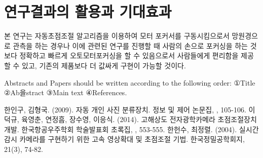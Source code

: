 \documentclass{abstract_hutech}
\begin{document}
\section{연구결과의 활용과 기대효과}

본 연구는 자동초점조절 알고리즘을 이용하여 모터 포커서를 구동시킴으로서 망원경으로 관측을 하는 경우나 이에 관련된 연구를 진행할 때 사람의 손으로 포커싱을 하는 것보다 정확하고 빠르게 오토모터포커싱을 할 수 있음으로서 사람들에게 편리함을 제공할 수 있고, 기존의 제품보다 더 값싸게 구현이 가능할 것이다.

Abstracts and Papers should be written according to the following order: ①Title ②Ab을stract ③Main text ④References.

\begin{thebibliography}{99}
 한인구, 김형국. (2009). 자동 개인 사진 분류장치. 정보 및 제어 논문집, , 105-106.
 이덕규, 육영춘, 연정흠, 장수영, 이응식. (2014). 고해상도 전자광학카메라 초점조절장치 개발. 한국항공우주학회 학술발표회 초록집, , 553-555.
 한헌수, 최정렬. (2004). 실시간 감시 카메라를 구현하기 위한 고속 영상확대 및 초점조절 기법. 한국정밀공학회지, 21(3), 74-82.
\end{thebibliography}
\end{document}
